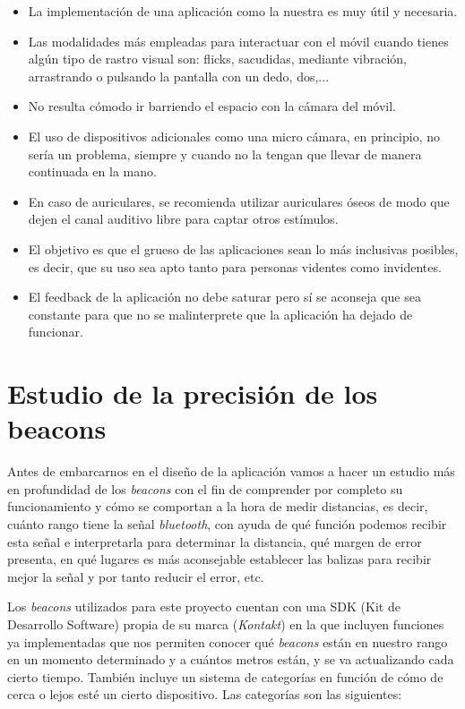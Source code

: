 \begin{itemize}
	\item La implementación de una aplicación como la nuestra es muy útil y necesaria.
	\item Las modalidades más empleadas para interactuar con el móvil cuando tienes algún tipo de rastro visual son: flicks, sacudidas, mediante vibración, arrastrando o pulsando la pantalla con un dedo, dos,...
	\item No resulta cómodo ir barriendo el espacio con la cámara del móvil.
	\item El uso de dispositivos adicionales como una micro cámara, en principio, no sería un problema, siempre y cuando no la tengan que llevar de manera continuada en la mano.
	\item En caso de auriculares, se recomienda utilizar auriculares óseos de modo que dejen el canal auditivo libre para captar otros estímulos.
	\item El objetivo es que el grueso de las aplicaciones sean lo más inclusivas posibles, es decir, que su uso sea apto tanto para personas videntes como invidentes.
	\item El feedback de la aplicación no debe saturar pero sí se aconseja que sea constante para que no se malinterprete que la aplicación ha dejado de funcionar.
\end{itemize}


\section{Estudio de la precisión de los beacons}

Antes de embarcarnos en el diseño de la aplicación vamos a hacer un estudio más en profundidad de los \textit{beacons} con el fin de comprender por completo su funcionamiento y cómo se comportan a la hora de medir distancias, es decir, cuánto rango tiene la señal \textit{bluetooth}, con ayuda de qué función podemos recibir esta señal e interpretarla para determinar la distancia, qué margen de error presenta, en qué lugares es más aconsejable establecer las balizas para recibir mejor la señal y por tanto reducir el error, etc. %

Los \textit{beacons} utilizados para este proyecto cuentan con una SDK (Kit de Desarrollo Software) propia de su marca (\textit{Kontakt}) en la que incluyen funciones ya implementadas que nos permiten conocer qué \textit{beacons} están en nuestro rango en un momento determinado y a cuántos metros están, y se va actualizando cada cierto tiempo. También incluye un sistema de categorías en función de cómo de cerca o lejos esté un cierto dispositivo. Las categorías son las siguientes:

